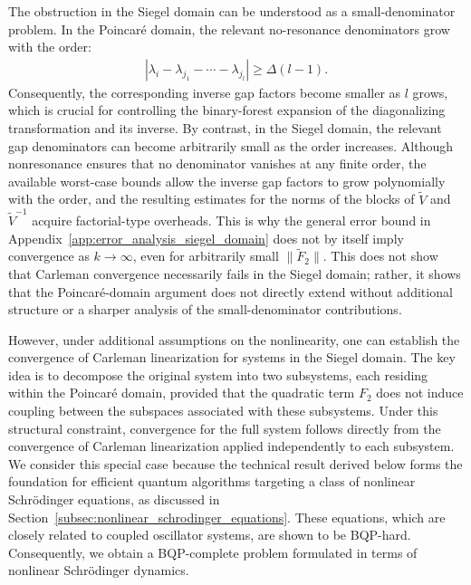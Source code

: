 \documentclass[superscriptaddress,onecolumn,nofootinbib,longbibliography,a4paper,accepted=2026-09-29]{quantumarticle}
\theoremstyle{plain}
\theoremstyle{definition}
\numberwithin{thm}{section}
\numberwithin{assumption}{section}
\numberwithin{lemma}{section}
\numberwithin{prop}{section}
\numberwithin{cor}{section}
\numberwithin{definition}{section}
\numberwithin{rmk}{section}
\numberwithin{equation}{section}
\begin{document}
The obstruction in the Siegel domain can be understood as a small-denominator problem. In the Poincar\'{e} domain, the relevant no-resonance denominators grow with the order: 
\begin{align}
\left|\lambda_i-\lambda_{j_1}-\cdots-\lambda_{j_l}\right|
\geq \Delta(l-1).
\end{align}
Consequently, the corresponding inverse gap factors become smaller as $l$ grows, which is crucial for controlling the binary-forest expansion of the diagonalizing transformation and its inverse. By contrast, in the Siegel domain, the relevant gap denominators can become arbitrarily small as the order increases. Although nonresonance ensures that no denominator vanishes at any finite order, the available worst-case bounds allow the inverse gap factors to grow polynomially with the order, and the resulting estimates for the norms of the blocks of $\tilde{V}$ and $\tilde{V}^{-1}$ acquire factorial-type overheads. This is why the general error bound in Appendix~\ref{app:error_analysis_siegel_domain} does not by itself imply convergence as $k\to\infty$, even for arbitrarily small $\|\tilde{F}_2\|$. This does not show that Carleman convergence necessarily fails in the Siegel domain; rather, it shows that the Poincar\'{e}-domain argument does not directly extend without additional structure or a sharper analysis of the small-denominator contributions.

However, under additional assumptions on the nonlinearity, one can establish the convergence of Carleman linearization for systems in the Siegel domain. The key idea is to decompose the original system into two subsystems, each residing within the Poincar\'{e} domain, provided that the quadratic term $F_2$ does not induce coupling between the subspaces associated with these subsystems. Under this structural constraint, convergence for the full system follows directly from the convergence of Carleman linearization applied independently to each subsystem. We consider this special case because the technical result derived below forms the foundation for efficient quantum algorithms targeting a class of nonlinear Schr\"{o}dinger equations, as discussed in Section~\ref{subsec:nonlinear_schrodinger_equations}. These equations, which are closely related to coupled oscillator systems, are shown to be BQP-hard. Consequently, we obtain a BQP-complete problem formulated in terms of nonlinear Schr\"{o}dinger dynamics.
\end{document}
